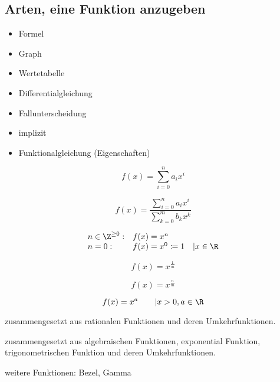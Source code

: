 \subsection{Arten, eine Funktion anzugeben}
\begin{itemize}
	\item Formel
	\item Graph
	\item Wertetabelle
	\item Differentialgleichung
	\item Fallunterscheidung
	\item implizit
	\item Funktionalgleichung (Eigenschaften)
\end{itemize}
\begin{def*}[note = Polynomfunktion , index = Funktion!Polynom-]
	\[ f(x) = \sum_{i=0}^n a_i x^i \]
\end{def*}
\begin{def*}[note = Gebrochenrationalefunktion , index = Funktion!Gebrochenrationale-]
	\[ f(x) = \frac{\sum_{i=0}^n a_i x^i}{\sum_{k=0}^m b_k x^k} \]
\end{def*}
\begin{def*}[note = Potenzfunktion , index = Funktion!Potenz-]
	\[\begin{matrix*}[l]
		n \in \Z^{\geq 0}:	&f(x) = x^n	\\
		n=0 :				&f(x) = x^0 \coloneqq 1	&|x \in \R
	\end{matrix*}\]
\end{def*}
\begin{def*}[note = Wurzelfunktion , index = Funktion!Wurzel-]
	\[ f(x) = x^{\frac{1}{m}} \]
\end{def*}
\begin{def*}[note = rationale Potenzfunktion , index = Funktion!Potenz-!rationale]
	\[ f(x) = x^{\frac{n}{m}} \]
\end{def*}
\begin{def*}[note = allgemeine Potenzfunktion , index = Funktion!Potenz-!allgemeine]
	\[ f(x) = x^a \qquad | x > 0, a \in \R \]
\end{def*}
\begin{def*}[note = algebraische Funktion , index = Funktion!algebraische]
	zusammengesetzt aus rationalen Funktionen und deren Umkehrfunktionen.
\end{def*}
\begin{def*}[note = elementare Funktion , index = Funktion!elementare]
	zusammengesetzt aus algebraischen Funktionen, exponential Funktion, trigonometrischen Funktion und deren Umkehrfunktionen.
\end{def*}
weitere Funktionen: Bezel, Gamma

